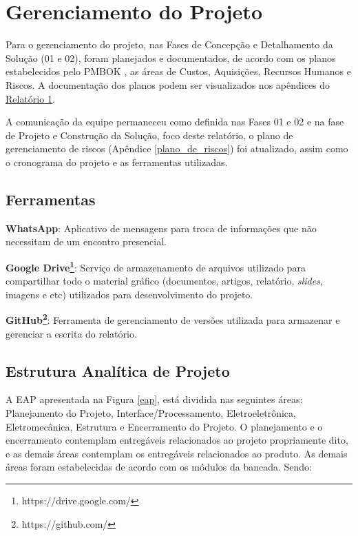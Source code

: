 \chapter{Gerenciamento do Projeto}

Para o gerenciamento do projeto, nas Fases de Concepção e Detalhamento da Solução (01 e 02), foram planejados e documentados, de acordo com os planos estabelecidos pelo PMBOK \cite{pmbok}, as 
áreas de Custos, Aquisições, Recursos Humanos e Riscos. A documentação dos planos podem ser visualizados nos apêndices do 
\href{https://drive.google.com/file/d/0B5InkGKx6O-MR1B3eVYzZFpjQ3c/view?usp=sharing}{Relatório 1}. 

A comunicação da equipe permaneceu como definida nas Fases 01 e 02 e na fase de Projeto e Construção da Solução, foco deste relatório, o plano de gerenciamento de riscos 
(Apêndice \ref{plano_de_riscos}) foi atualizado, assim como o cronograma do projeto e as ferramentas utilizadas. 

\section*{Ferramentas}

\textbf{WhatsApp}:
Aplicativo de mensagens para troca de informações que não necessitam de um encontro presencial.

\textbf{Google Drive\footnote{https://drive.google.com/}}: Serviço de armazenamento de arquivos utilizado para compartilhar todo o material gráfico (documentos, artigos, relatório, \textit{slides}, imagens e etc) utilizados para desenvolvimento do projeto.

\textbf{GitHub\footnote{https://github.com/}}: Ferramenta de gerenciamento de versões utilizada para armazenar e gerenciar 
a escrita do relatório.

\section*{Estrutura Analítica de Projeto}

A EAP apresentada na Figura \ref{eap}, está dividida nas seguintes áreas: Planejamento do Projeto, Interface/Processamento, Eletroeletrônica, Eletromecânica, Estrutura e Encerramento do Projeto. O planejamento e o encerramento contemplam entregáveis relacionados ao projeto propriamente dito, e as demais áreas contemplam os entregáveis relacionados ao produto. As demais áreas foram estabelecidas de acordo com os módulos da bancada. Sendo:

